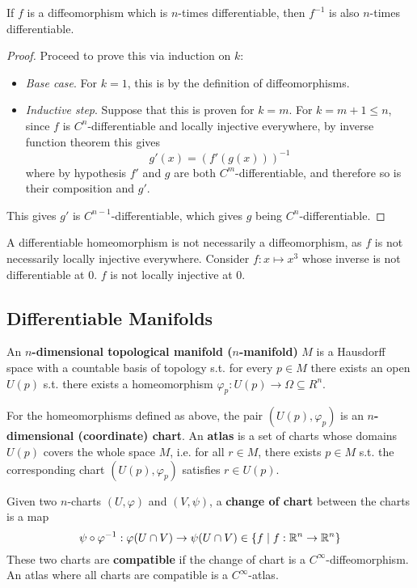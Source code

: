 \documentclass{article}
\begin{document}
\begin{proposition}
    If $f$ is a diffeomorphism which is $n$-times differentiable, then $f^{-1}$ is also $n$-times differentiable.
\end{proposition}

\begin{proof}
    Proceed to prove this via induction on $k$:
    \begin{itemize}
        \item \emph{Base case}. For $k = 1$, this is by the definition of diffeomorphisms.
        \item \emph{Inductive step}. Suppose that this is proven for $k = m$. For $k = m+1 \leq n$, since $f$ is $C^n$-differentiable and locally injective everywhere, by inverse function theorem this gives
        \[
            g'(x) = (f'(g(x)))^{-1}
        \]
        where by hypothesis $f'$ and $g$ are both $C^m$-differentiable, and therefore so is their composition and $g'$.
    \end{itemize}
    This gives $g'$ is $C^{n-1}$-differentiable, which gives $g$ being $C^n$-differentiable.
\end{proof}

\begin{remark}
    A differentiable homeomorphism is not necessarily a diffeomorphism, as $f$ is not necessarily locally injective everywhere. Consider $f: x \mapsto x^3$ whose inverse is not differentiable at $0$. $f$ is not locally injective at 0.  
\end{remark}

\subsection{Differentiable Manifolds}

\begin{definition}[Manifold]
    An \textbf{$n$-dimensional topological manifold ($n$-manifold)} $M$ is a Hausdorff space with a countable basis of topology s.t. for every $p \in M$ there exists an open $U(p)$ s.t. there exists a homeomorphism $\varphi_p: U(p) \to \Omega \subseteq R^n$.
\end{definition}

\begin{definition}
    For the homeomorphisms defined as above, the pair $(U(p), \varphi_p)$ is an \textbf{$n$-dimensional (coordinate) chart}. An \textbf{atlas} is a set of charts whose domains $U(p)$ covers the whole space $M$, i.e. for all $r \in M$, there exists $p \in M$ s.t. the corresponding chart $(U(p), \varphi_p)$ satisfies $r \in U(p)$. 

    Given two $n$-charts $(U, \varphi)$ and $(V, \psi)$, a \textbf{change of chart} between the charts is a map
    \[
        \psi \circ \varphi^{-1} : \varphi(U \cap V) \to \psi(U \cap V) \in \{f \mid f: \mathbb{R}^n \to \mathbb{R}^n\}
    \]
    These two charts are \textbf{compatible} if the change of chart is a $C^{\infty}$-diffeomorphism. An atlas where all charts are compatible is a $C^{\infty}$-atlas.
\end{definition}
\end{document}
